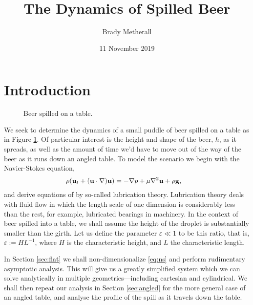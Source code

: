\documentclass[11pt,a4paper,twocolumn]{article}
\title{The Dynamics of Spilled Beer}
\author{Brady Metherall}
\date{11 November 2019}
\let\originalleft\left
\let\originalright\right
\renewcommand{\left}{\mathopen{}\mathclose\bgroup\originalleft}
\renewcommand{\right}{\aftergroup\egroup\originalright}
\newcommand{\eps}{\varepsilon}
\begin{document}
\maketitle


\setlength{\belowdisplayskip}{6.5pt} \setlength{\belowdisplayshortskip}{6.5pt}
\setlength{\abovedisplayskip}{6.5pt} \setlength{\abovedisplayshortskip}{6.5pt}


\section{Introduction}
\begin{figure}[tbp]
\centering
{}
\caption{Beer spilled on a table.}
\label{fig:beer}
\end{figure}

We seek to determine the dynamics of a small puddle of beer spilled on a table as in Figure \ref{fig:beer}. Of particular interest is the height and shape of the beer, $h$, as it spreads, as well as the amount of time we'd have to move out of the way of the beer as it runs down an angled table. To model the scenario we begin with the Navier-Stokes equation,
\begin{align}
\rho \left( \mathbf{u}_t + \left( \mathbf{u} \cdot \nabla \right) \mathbf{u} \right) &= - \nabla p + \mu \nabla^2 \mathbf{u} + \rho \mathbf{g},
\label{eq:ns}
\end{align}
and derive equations of by so-called lubrication theory. Lubrication theory deals with fluid flow in which the length scale of one dimension is considerably less than the rest, for example, lubricated bearings in machinery. In the context of beer spilled into a table, we shall assume the height of the droplet is substantially smaller than the girth. Let us define the parameter $\eps \ll 1$ to be this ratio, that is, $\eps := H L^{-1}$, where $H$ is the characteristic height, and $L$ the characteristic length.

In Section \ref{sec:flat} we shall non-dimensionalize \eqref{eq:ns} and perform rudimentary asymptotic analysis. This will give us a greatly simplified system which we can solve analytically in multiple geometries---including cartesian and cylindrical. We shall then repeat our analysis in Section \ref{sec:angled} for the more general case of an angled table, and analyse the profile of the spill as it travels down the table.
\end{document}
